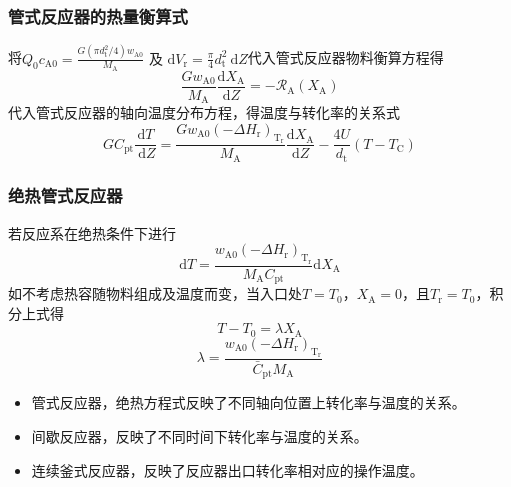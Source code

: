 \begin{frame}
    \frametitle{管式反应器的热量衡算式}

    将$Q_{0} c_{\mathrm{A} 0}=\frac{G(\pi d_{\mathrm{t}}^{2} / 4) w_{\mathrm{A} 0}}{M_{\mathrm{A}}} \text { 及 } \mathrm{d} V_{\mathrm{r}}=\frac{\pi}{4} d_{\mathrm{t}}^{2} \mathrm{~d} Z$代入管式反应器物料衡算方程得
    \[
        \frac{G w_{\mathrm{A} 0}}{M_{\mathrm{A}}} \frac{\mathrm{d} X_{\mathrm{A}}}{\mathrm{d} Z}=-\mathscr{R}_{\mathrm{A}}(X_{\mathrm{A}})
    \]
    代入管式反应器的轴向温度分布方程，得温度与转化率的关系式
    \[
        G C_{\mathrm{pt}} \frac{\mathrm{d} T}{\mathrm{~d} Z}=\frac{G w_{\mathrm{A} 0}(-\Delta H_{\mathrm{r}})_{\mathrm{T}_{\mathrm{r}}}}{M_{\mathrm{A}}} \frac{\mathrm{d} X_{\mathrm{A}}}{\mathrm{d} Z}-\frac{4 U}{d_{\mathrm{t}}}(T-T_{\mathrm{C}})
    \]

\end{frame}


\begin{frame}
    \frametitle{绝热管式反应器}

    若反应系在绝热条件下进行
    \[
        \mathrm{d} T=\frac{w_{\mathrm{A} 0}(-\Delta H_{\mathrm{r}})_{\mathrm{T}_{\mathrm{r}}}}{M_{\mathrm{A}}C_{\mathrm{pt}}} \mathrm{d} X_{\mathrm{A}}
    \]
    如不考虑热容随物料组成及温度而变，当入口处$T=T_0$，$X_\mathrm{A}=0$，且$T_\mathrm{r}=T_0$，积分上式得
    \[
        T - T_0 = \lambda X_\mathrm{A}
    \]
    \[
        \lambda = \frac{w_{\mathrm{A} 0}(-\Delta H_{\mathrm{r}})_{\mathrm{T}_{\mathrm{r}}}}{\bar C_{\mathrm{pt}}M_{\mathrm{A}}}
    \]
    \begin{itemize}
        \item 管式反应器，绝热方程式反映了不同轴向位置上转化率与温度的关系。
        \item 间歇反应器，反映了不同时间下转化率与温度的关系。
        \item 连续釜式反应器，反映了反应器出口转化率相对应的操作温度。
    \end{itemize}
    

\end{frame}


